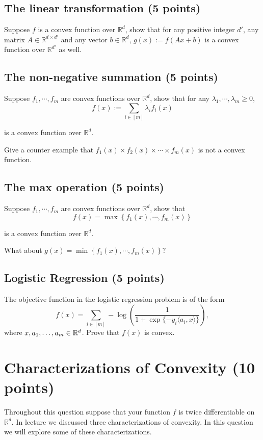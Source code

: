 \subsection{The linear transformation (5 points)}

Suppose $f$ is a convex function over $\mathbb{R}^d$, show that for any positive integer $d'$, any matrix $A \in \mathbb{R}^{d \times d'}$ and any vector $b \in \mathbb{R}^{d}$, $g(x) := f(Ax + b)$ is a convex function over $\mathbb{R}^{d'}$ as well. 

\subsection{The non-negative summation (5 points)}

Suppose $f_1, \cdots, f_m$ are convex functions over $\mathbb{R}^d$, show that for any $\lambda_1, \cdots, \lambda_m \geq 0$, 
$$f(x) := \sum_{i \in [m]}\lambda_i f_i(x)$$


is a convex function over  $\mathbb{R}^d$. 


Give a counter example that $f_1(x) \times f_2( x) \times \cdots \times f_m(x)$ is not a convex function. 

\subsection{The max operation (5 points)}

Suppose $f_1, \cdots, f_m$ are convex functions over $\mathbb{R}^d$, show that
$$f(x) = \max \left\{ f_1(x), \cdots, f_m(x) \right\}$$


is a convex function over  $\mathbb{R}^d$. 


What about  $g(x) = \min \left\{ f_1(x), \cdots, f_m(x) \right\}$?

\subsection{Logistic Regression (5 points)}

The objective function in the logistic regression problem is of the form
\[
f(x) = \sum_{i\in[m]} -\log\left(\frac{1}{1+\exp\{-y_i \langle a_i, x\rangle\}}\right),
\]
where $x, a_1, \dots, a_m \in \mathbb{R}^d$.
%
Prove that $f(x)$ is convex.




\newpage
\section{Characterizations of Convexity (10 points)}
Throughout this question suppose that your function $f$ is twice differentiable on $\mathbb{R}^d$. 
In lecture we discussed three characterizations of convexity. In this question we will explore some of these characterizations.

